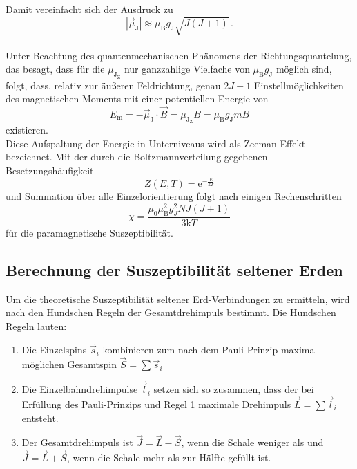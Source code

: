 Damit vereinfacht sich der Ausdruck zu 
\begin{equation}
    |\vec{\mu}_\text{J}| \approx \mu_\text{B} g_\text{J} \sqrt{J(J + 1)} \,.
\end{equation} \\

Unter Beachtung des quantenmechanischen Phänomens der Richtungsquantelung, das besagt, dass für die $\mu_{\text{J}_\text{Z}}$ nur ganzzahlige Vielfache von $\mu_\text{B}g_\text{J}$ möglich sind, folgt,
dass, relativ zur äußeren Feldrichtung, genau $2J + 1$ Einstellmöglichkeiten des magnetischen Moments mit einer potentiellen Energie von
\begin{equation}
    E_\text{m} = - \vec{\mu}_\text{J} \cdot \vec{B} = \mu_{\text{J}_\text{Z}} B = \mu_\text{B} g_\text{J} m B
\end{equation}
existieren. \\

Diese Aufspaltung der Energie in Unterniveaus wird als Zeeman-Effekt bezeichnet.
Mit der durch die Boltzmannverteilung gegebenen Besetzungshäufigkeit
\begin{equation}
    Z(E,T) = \text{e}^{-\frac{E}{\text{k}T}}
\end{equation}
und Summation über alle Einzelorientierung folgt nach einigen Rechenschritten
\begin{equation}
    \chi = \dfrac{\mu_0 \mu^2_\text{B} g^2_J N J(J + 1)}{3 \text{k} T}
    \label{eq:susg_J}
\end{equation}
für die paramagnetische Suszeptibilität. \\

\subsection{Berechnung der Suszeptibilität seltener Erden}

Um die theoretische Suszeptibilität seltener Erd-Verbindungen zu ermitteln, wird nach den Hundschen Regeln der Gesamtdrehimpuls bestimmt.
Die Hundschen Regeln lauten:

\begin{enumerate}
    \item Die Einzelspins $\vec{s}_i$ kombinieren zum nach dem Pauli-Prinzip maximal möglichen Gesamtspin $\vec{S} = \sum\vec{s}_i$
    \item Die Einzelbahndrehimpulse $\vec{l}_i$ setzen sich so zusammen, dass der bei Erfüllung des Pauli-Prinzips und Regel 1 maximale Drehimpuls $\vec{L} = \sum \vec{l}_i$ entsteht.
    \item Der Gesamtdrehimpuls ist $\vec{J} = \vec{L} - \vec{S}$, wenn die Schale weniger als und $\vec{J} = \vec{L} + \vec{S}$, wenn die Schale mehr als zur Hälfte gefüllt ist.
\end{enumerate}

